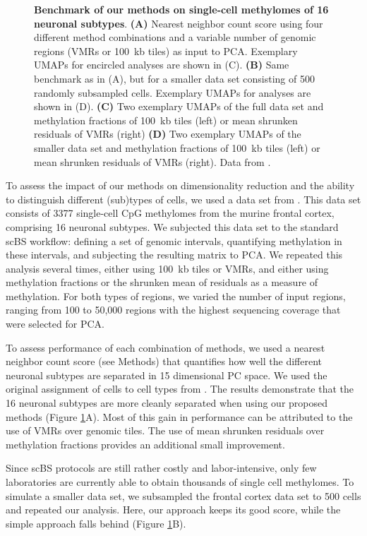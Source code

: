 \documentclass[twocolumn,10pt]{article}
\begin{document}
\begin{figure}
\begin{center}
        \caption{\small \textbf{Benchmark of our methods on single-cell methylomes of 16 neuronal subtypes}. \textbf{(A)} Nearest neighbor count score using four different method combinations and a variable number of genomic regions (VMRs or 100~kb tiles) as input to PCA. Exemplary UMAPs for encircled analyses are shown in (C). \textbf{(B)} Same benchmark as in (A), but for a smaller data set consisting of 500 randomly subsampled cells. Exemplary UMAPs for analyses are shown in (D). \textbf{(C)} Two exemplary UMAPs of the full data set and methylation fractions of 100~kb tiles (left) or mean shrunken residuals of VMRs (right) \textbf{(D)} Two exemplary UMAPs of the smaller data set and methylation fractions of 100~kb tiles (left) or mean shrunken residuals of VMRs (right). Data from \citet{luo2017single}.}
        \label{figure:score}
    \end{center}
\end{figure}

To assess the impact of our methods on dimensionality reduction and the ability to distinguish different (sub)types of cells, we used a data set from \citet{luo2017single}. This data set consists of 3377 single-cell CpG methylomes from the murine frontal cortex, comprising 16 neuronal subtypes.
We subjected this data set to the standard scBS workflow: defining a set of genomic intervals, quantifying methylation in these intervals, and subjecting the resulting matrix to PCA.
We repeated this analysis several times, either using 100~kb tiles or VMRs, and either using methylation fractions or the shrunken mean of residuals as a measure of methylation. 
For both types of regions, we varied the number of input regions, ranging from 100 to 50,000 regions with the highest sequencing coverage that were selected for PCA.

To assess performance of each combination of methods, we used a nearest neighbor count score (see Methods) that quantifies how well the different neuronal subtypes are separated in 15 dimensional PC space. We used the original assignment of cells to cell types from \citet{luo2017single}.
The results demonstrate that the 16 neuronal subtypes are more cleanly separated when using our proposed methods (Figure \ref{figure:score}A).
Most of this gain in performance can be attributed to the use of VMRs over genomic tiles. The use of mean shrunken residuals over methylation fractions provides an additional small improvement.

Since scBS protocols are still rather costly and labor-intensive, only few laboratories are currently able to obtain thousands of single cell methylomes.
To simulate a smaller data set, we subsampled the frontal cortex data set to 500 cells and repeated our analysis.
Here, our approach keeps its good score, while the simple approach falls behind (Figure \ref{figure:score}B).
\end{document}
